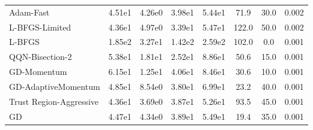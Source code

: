 \documentclass{article}
\begin{document}
\begin{table}[htbp]
{\begin{tabular}{p{2.5cm}*{7}{c}}
Adam-Fast & 4.51e1 & 4.26e0 & 3.98e1 & 5.44e1 & 71.9 & 30.0 & 0.002 \\
L-BFGS-Limited & 4.36e1 & 4.97e0 & 3.39e1 & 5.47e1 & 122.0 & 50.0 & 0.002 \\
L-BFGS & 1.85e2 & 3.27e1 & 1.42e2 & 2.59e2 & 102.0 & 0.0 & 0.001 \\
QQN-Bisection-2 & 5.38e1 & 1.81e1 & 2.52e1 & 8.86e1 & 50.6 & 15.0 & 0.001 \\
GD-Momentum & 6.15e1 & 1.25e1 & 4.06e1 & 8.46e1 & 30.6 & 10.0 & 0.001 \\
GD-AdaptiveMomentum & 4.85e1 & 8.54e0 & 3.80e1 & 6.99e1 & 23.2 & 40.0 & 0.001 \\
Trust Region-Aggressive & 4.36e1 & 3.69e0 & 3.87e1 & 5.26e1 & 93.5 & 45.0 & 0.001 \\
GD & 4.47e1 & 4.34e0 & 3.89e1 & 5.49e1 & 19.4 & 35.0 & 0.001 \\
\bottomrule
\end{tabular}
}
\end{table}
\end{document}
